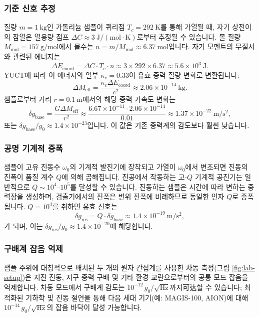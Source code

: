 \documentclass[11pt,a4paper]{article}
\begin{document}
	\subsubsection{기준 신호 추정}
	질량 $m = 1\ \mathrm{kg}$인 가돌리늄 샘플이 퀴리점 $T_c = 292\ \mathrm{K}$를 통해 가열될 때, 자기 상전이의 잠열은 열용량 점프 $\Delta C \approx 3\ \mathrm{J/(mol\cdot K)}$로부터 추정될 수 있습니다. 몰 질량 $M_{\mathrm{mol}} = 157\ \mathrm{g/mol}$에서 몰수는 $n = m / M_{\mathrm{mol}} \approx 6.37\ \mathrm{mol}$입니다. 자기 모멘트의 무질서와 관련된 에너지는
	\[
	\Delta E_{\mathrm{coord}} = \Delta C \cdot T_c \cdot n \approx 3 \times 292 \times 6.37 \approx 5.6\times10^{3}\ \mathrm{J}.
	\]
	YUCT에 따라 이 에너지의 일부 $\kappa_c = 0.33$이 유효 중력 질량 변화로 변환됩니다:
	\[
	\Delta M_{\mathrm{eff}} = \frac{\kappa_c \Delta E_{\mathrm{coord}}}{c^2} \approx 2.06\times10^{-14}\ \mathrm{kg}.
	\]
	샘플로부터 거리 $r = 0.1\ \mathrm{m}$에서의 해당 중력 가속도 변화는
	\[
	\delta g_{\mathrm{base}} = \frac{G \Delta M_{\mathrm{eff}}}{r^2} \approx \frac{6.67\times10^{-11} \cdot 2.06\times10^{-14}}{0.01} \approx 1.37\times10^{-22}\ \mathrm{m/s^2},
	\]
	또는 $\delta g_{\mathrm{base}}/g_0 \approx 1.4\times10^{-23}$입니다. 이 값은 기존 중력계의 감도보다 훨씬 낮습니다.
	
	\subsubsection{공명 기계적 증폭}
	샘플이 고유 진동수 $\omega_0$의 기계적 발진기에 장착되고 가열이 $\omega_0$에서 변조되면 진동의 진폭이 품질 계수 $Q$에 의해 곱해집니다. 진공에서 작동하는 고-$Q$ 기계적 공진기는 일반적으로 $Q \sim 10^4$–$10^5$를 달성할 수 있습니다. 진동하는 샘플은 시간에 따라 변하는 중력장을 생성하며, 검출기에서의 진폭은 변위 진폭에 비례하므로 동일한 인자 $Q$로 증폭됩니다. $Q = 10^4$를 취하면 유효 신호는
	\[
	\delta g_{\mathrm{res}} = Q \cdot \delta g_{\mathrm{base}} \approx 1.4\times10^{-19}\ \mathrm{m/s^2},
	\]
	가 되며, 이는 $\delta g_{\mathrm{res}}/g_0 \approx 1.4\times10^{-20}$에 해당합니다.
	
	\subsubsection{구배계 잡음 억제}
	샘플 주위에 대칭적으로 배치된 두 개의 원자 간섭계를 사용한 차동 측정(그림 \ref{fig:lab-setup})은 지진 진동, 지구 중력 구배 및 기타 환경 교란으로부터의 공통 모드 잡음을 억제합니다. 차동 모드에서 구배계 감도는 $10^{-12}\,g_0/\sqrt{\mathrm{Hz}}$까지可达할 수 있습니다; 최적화된 기하학 및 진동 절연을 통해 다음 세대 기기(예: MAGIS-100, AION)에 대해 $10^{-14}\,g_0/\sqrt{\mathrm{Hz}}$의 잡음 바닥이 달성 가능합니다.
	
\end{document}
